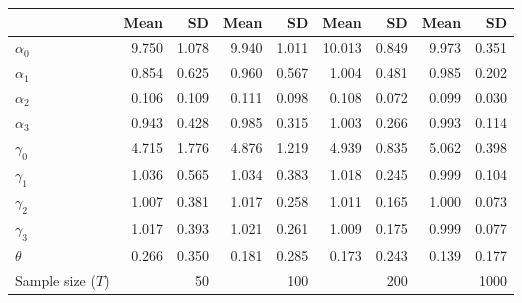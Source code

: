 
\begin{tabular}[t]{lrrrrrrrr}
\toprule
  & Mean & SD & Mean  & SD  & Mean   & SD   & Mean    & SD   \\
\midrule
$\alpha_{0}$ & 9.750 & 1.078 & 9.940 & 1.011 & 10.013 & 0.849 & 9.973 & 0.351\\
$\alpha_{1}$ & 0.854 & 0.625 & 0.960 & 0.567 & 1.004 & 0.481 & 0.985 & 0.202\\
$\alpha_{2}$ & 0.106 & 0.109 & 0.111 & 0.098 & 0.108 & 0.072 & 0.099 & 0.030\\
$\alpha_{3}$ & 0.943 & 0.428 & 0.985 & 0.315 & 1.003 & 0.266 & 0.993 & 0.114\\
$\gamma_{0}$ & 4.715 & 1.776 & 4.876 & 1.219 & 4.939 & 0.835 & 5.062 & 0.398\\
$\gamma_{1}$ & 1.036 & 0.565 & 1.034 & 0.383 & 1.018 & 0.245 & 0.999 & 0.104\\
$\gamma_{2}$ & 1.007 & 0.381 & 1.017 & 0.258 & 1.011 & 0.165 & 1.000 & 0.073\\
$\gamma_{3}$ & 1.017 & 0.393 & 1.021 & 0.261 & 1.009 & 0.175 & 0.999 & 0.077\\
$\theta$ & 0.266 & 0.350 & 0.181 & 0.285 & 0.173 & 0.243 & 0.139 & 0.177\\
Sample size ($T$) &  & 50 &  & 100 &  & 200 &  & 1000\\
\bottomrule
\end{tabular}
